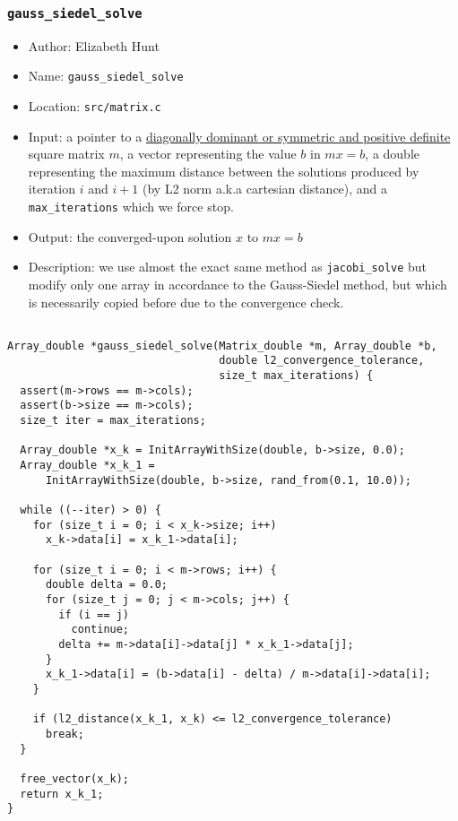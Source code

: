 \documentclass[11pt]{article}
\begin{document}
\subsubsection{\texttt{gauss\_siedel\_solve}}
\label{sec:org6633923}
\begin{itemize}
\item Author: Elizabeth Hunt
\item Name: \texttt{gauss\_siedel\_solve}
\item Location: \texttt{src/matrix.c}
\item Input: a pointer to a \href{https://en.wikipedia.org/wiki/Gauss\%E2\%80\%93Seidel\_method}{diagonally dominant or symmetric and positive definite}
square matrix \(m\), a vector representing
the value \(b\) in \(mx = b\), a double representing the maximum distance between
the solutions produced by iteration \(i\) and \(i+1\) (by L2 norm a.k.a cartesian
distance), and a \texttt{max\_iterations} which we force stop.
\item Output: the converged-upon solution \(x\) to \(mx = b\)
\item Description: we use almost the exact same method as \texttt{jacobi\_solve} but modify
only one array in accordance to the Gauss-Siedel method, but which is necessarily
copied before due to the convergence check.
\end{itemize}
\begin{verbatim}

Array_double *gauss_siedel_solve(Matrix_double *m, Array_double *b,
                                 double l2_convergence_tolerance,
                                 size_t max_iterations) {
  assert(m->rows == m->cols);
  assert(b->size == m->cols);
  size_t iter = max_iterations;

  Array_double *x_k = InitArrayWithSize(double, b->size, 0.0);
  Array_double *x_k_1 =
      InitArrayWithSize(double, b->size, rand_from(0.1, 10.0));

  while ((--iter) > 0) {
    for (size_t i = 0; i < x_k->size; i++)
      x_k->data[i] = x_k_1->data[i];

    for (size_t i = 0; i < m->rows; i++) {
      double delta = 0.0;
      for (size_t j = 0; j < m->cols; j++) {
        if (i == j)
          continue;
        delta += m->data[i]->data[j] * x_k_1->data[j];
      }
      x_k_1->data[i] = (b->data[i] - delta) / m->data[i]->data[i];
    }

    if (l2_distance(x_k_1, x_k) <= l2_convergence_tolerance)
      break;
  }

  free_vector(x_k);
  return x_k_1;
}
\end{verbatim}
\end{document}
